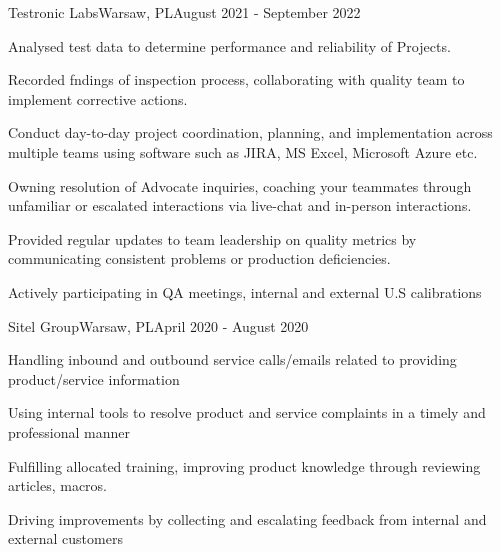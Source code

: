 \documentclass{article}
\newlength{\tabin}
\newlength{\secsep}
\newcommand{\lineunder}{\vspace*{-8pt} \\ \hspace*{-6pt} \hrulefill \\ \vspace*{-15pt}}
\newenvironment{tabbedsection}[1]{
  \begin{list}{}{
      \setlength{\itemsep}{0pt}
      \setlength{\labelsep}{0pt}
      \setlength{\labelwidth}{0pt}
      \setlength{\leftmargin}{\tabin}
      \setlength{\rightmargin}{\tabin}
      \setlength{\listparindent}{0pt}
      \setlength{\parsep}{0pt}
      \setlength{\parskip}{0pt}
      \setlength{\partopsep}{0pt}
      \setlength{\topsep}{#1}
    }
  \item[]
}{\end{list}}
\newenvironment{resume_section}[1]{
  \filbreak
  \vspace{2\secsep}
  \textsc{\large#1}
  \lineunder
  \begin{tabbedsection}{\secsep}
}{\end{tabbedsection}}
\newenvironment{subitems}{
  \renewcommand{\labelitemi}{-}
  \begin{itemize}
      \setlength{\labelsep}{1em}
}{\end{itemize}}
\newenvironment{resume_employer}[4]{
  \vspace{\secsep}
  \textbf{#1} \\ 
  \indent {\small #2} \hfill {\footnotesize#3 (#4)}
  \begin{tabbedsection}{0pt}
  \begin{subitems}
}{\end{subitems}\end{tabbedsection}}
\begin{document}
\begin{resume_section}{\color{violet}{Work Experience}}
\begin{resume_employer}{Testronic Labs}{\color{darkgray}{QA Technician}}{Warsaw, PL}{August
2021 - September 2022}
\item Analysed test data to determine performance and reliability of Projects. 
\item Recorded fndings of inspection process, collaborating with quality team to implement corrective actions.
\item Conduct day-to-day project coordination, planning, and implementation across multiple teams using software such as JIRA, MS Excel, Microsoft Azure etc.
\item Owning resolution of Advocate inquiries, coaching your teammates through unfamiliar or escalated interactions via live-chat and in-person interactions.
\item Provided regular updates to team leadership on quality metrics by communicating consistent problems or production deficiencies.
\item Actively participating in QA meetings, internal and external U.S calibrations \end{resume_employer}
\begin{resume_employer}{Sitel Group}{\color{darkgray}{Customer Service Specialist}}{Warsaw, PL}{April 2020 - August 2020}
\item Handling inbound and outbound service calls/emails related to providing product/service information
\item Using internal tools to resolve product and service complaints in a timely and professional manner
\item Fulfilling allocated training, improving product knowledge through reviewing articles, macros.
\item Driving improvements by collecting and escalating feedback from internal and external customers
\end{resume_employer} \end{resume_section}
\end{document}
